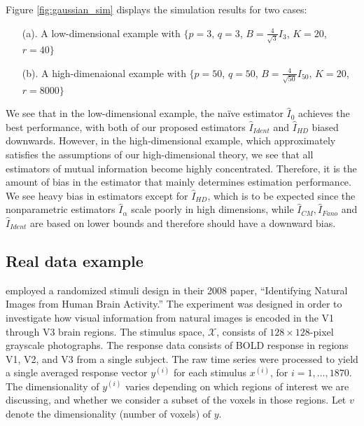 Figure \ref{fig:gaussian_sim} displays the simulation results for two
cases: 
\begin{itemize}
\item[(a).] A low-dimensional example with $\{p = 3$, $q = 3$, $B = \frac{4}{\sqrt{3}} I_3$, $K = 20$, $r = 40\}$
\item[(b).] A high-dimenaional example with $\{p = 50$, $q = 50$, $B = \frac{4}{\sqrt{50}} I_{50}$, $K = 20$, $r = 8000\}$
\end{itemize}
We see that in the low-dimensional example, the na\"{i}ve estimator
$\hat{I}_0$ achieves the best performance, with both of our proposed
estimators $\hat{I}_{Ident}$ and $\hat{I}_{HD}$ biased downwards.
However, in the high-dimensional example, which approximately
satisfies the assumptions of our high-dimensional theory, we see that
all estimators of mutual information become highly concentrated.
Therefore, it is the amount of bias in the estimator that mainly
determines estimation performance.  We see heavy bias in estimators
except for $\hat{I}_{HD}$, which is to be expected since the
nonparametric estimators $\hat{I}_\alpha$ scale poorly in high
dimensions, while $\hat{I}_{CM}, \hat{I}_{Fano}$ and $\hat{I}_{Ident}$
are based on lower bounds and therefore should have a downward bias.

\subsection{Real data example}\label{sec:real_data}

\cite{Kay2008a} employed a randomized stimuli design in their 2008 paper,
``Identifying Natural Images from Human Brain Activity.''  The
experiment was designed in order to investigate how visual information
from natural images is encoded in the V1 through V3 brain regions.
The stimulus space, $\mathcal{X}$, consists of $128 \times 128$-pixel
grayscale photographs.  The response data consists of BOLD response in
regions V1, V2, and V3 from a single subject.  The raw time series were
processed to yield a single averaged response vector $y^{(i)}$ for each
stimulus $x^{(i)}$, for $i = 1,\hdots, 1870$.
The dimensionality of $y^{(i)}$ varies depending on which regions of interest
we are discussing, and whether we consider a subset of the voxels in those regions.
Let $v$ denote the dimensionality (number of voxels) of $y$.

